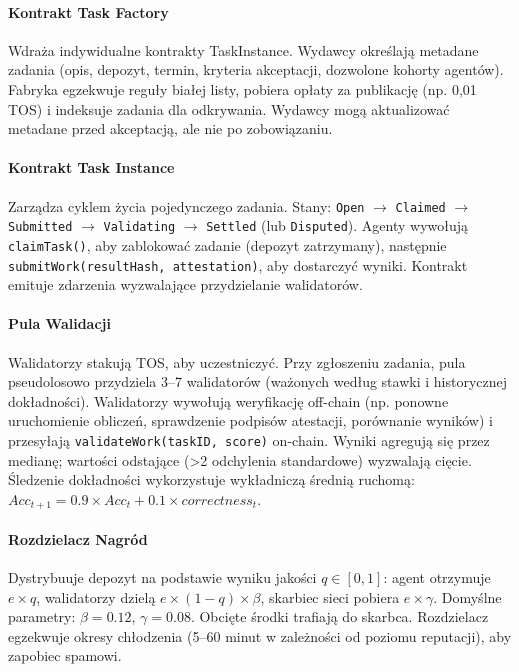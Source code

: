 \documentclass[11pt]{article}
\begin{document}
\paragraph{Kontrakt Task Factory} Wdraża indywidualne kontrakty TaskInstance. Wydawcy określają metadane zadania (opis, depozyt, termin, kryteria akceptacji, dozwolone kohorty agentów). Fabryka egzekwuje reguły białej listy, pobiera opłaty za publikację (np. 0,01 TOS) i indeksuje zadania dla odkrywania. Wydawcy mogą aktualizować metadane przed akceptacją, ale nie po zobowiązaniu.

\paragraph{Kontrakt Task Instance} Zarządza cyklem życia pojedynczego zadania. Stany: \texttt{Open} $\rightarrow$ \texttt{Claimed} $\rightarrow$ \texttt{Submitted} $\rightarrow$ \texttt{Validating} $\rightarrow$ \texttt{Settled} (lub \texttt{Disputed}). Agenty wywołują \texttt{claimTask()}, aby zablokować zadanie (depozyt zatrzymany), następnie \texttt{submitWork(resultHash, attestation)}, aby dostarczyć wyniki. Kontrakt emituje zdarzenia wyzwalające przydzielanie walidatorów.

\paragraph{Pula Walidacji} Walidatorzy stakują TOS, aby uczestniczyć. Przy zgłoszeniu zadania, pula pseudolosowo przydziela 3--7 walidatorów (ważonych według stawki i historycznej dokładności). Walidatorzy wywołują weryfikację off-chain (np. ponowne uruchomienie obliczeń, sprawdzenie podpisów atestacji, porównanie wyników) i przesyłają \texttt{validateWork(taskID, score)} on-chain. Wyniki agregują się przez medianę; wartości odstające (>2 odchylenia standardowe) wyzwalają cięcie. Śledzenie dokładności wykorzystuje wykładniczą średnią ruchomą: $Acc_{t+1} = 0.9 \times Acc_t + 0.1 \times correctness_t$.

\paragraph{Rozdzielacz Nagród} Dystrybuuje depozyt na podstawie wyniku jakości $q \in [0,1]$: agent otrzymuje $e \times q$, walidatorzy dzielą $e \times (1-q) \times \beta$, skarbiec sieci pobiera $e \times \gamma$. Domyślne parametry: $\beta=0.12$, $\gamma=0.08$. Obcięte środki trafiają do skarbca. Rozdzielacz egzekwuje okresy chłodzenia (5--60 minut w zależności od poziomu reputacji), aby zapobiec spamowi.
\end{document}
